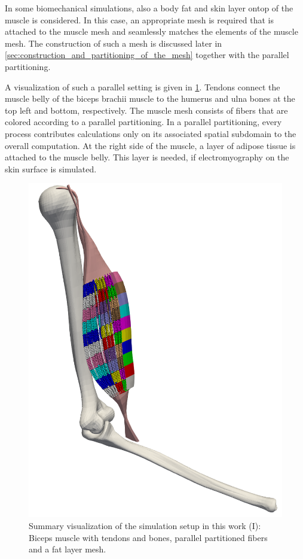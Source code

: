 In some biomechanical simulations, also a body fat and skin layer ontop of the muscle is considered. In this case, an appropriate mesh is required that is attached to the muscle mesh and seamlessly matches the elements of the muscle mesh. The construction of such a mesh is discussed later in \cref{sec:construction_and_partitioning_of_the_mesh} together with the parallel partitioning.

A visualization of such a parallel setting is given in \cref{fig:partitioning_biceps}. Tendons connect the muscle belly of the biceps brachii muscle to the humerus and ulna bones at the top left and bottom, respectively. The muscle mesh consists of fibers that are colored according to a parallel partitioning. In a parallel partitioning, every process contributes calculations only on its associated spatial subdomain to the overall computation. At the right side of the muscle, a layer of adipose tissue is attached to the muscle belly. This layer is needed, if electromyography on the skin surface is simulated. 

\begin{figure}
  \centering%
  \includegraphics[width=\textwidth]{images/parallel_fiber_estimation/partitioning_biceps.png}%
  \caption{Summary visualization of the simulation setup in this work (I): Biceps muscle with tendons and bones, parallel partitioned fibers and a fat layer mesh.}%
  \label{fig:partitioning_biceps}%
\end{figure}%

